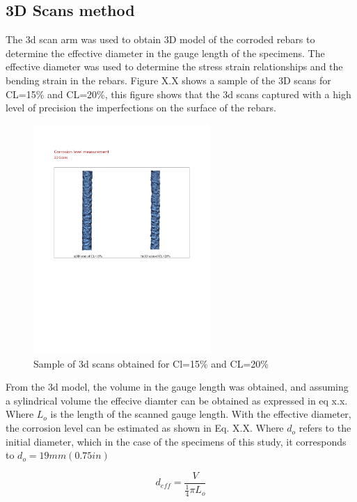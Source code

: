 \subsection{3D Scans method}

The 3d scan arm was used to obtain 3D model of the corroded rebars to determine the effective diameter in the gauge length of the specimens. The effective diameter was used to determine the stress strain relationships and the bending strain in the rebars. Figure X.X shows a sample of the 3D scans for CL=15\% and CL=20\%, this figure shows that the 3d scans captured with a high level of precision the imperfections on the surface of the rebars. 

\begin{figure}[htbp]
	\centering
	\includegraphics[width=0.6\textwidth]{VAC Thesis 2.0/Chapter-4/figs/3dScans_sample.pdf}
	\caption{Sample of 3d scans obtained for Cl=15\% and CL=20\%}
    \label{fig:3D_scans_sample}
\end{figure}

From the 3d model, the volume in the gauge length was obtained, and assuming a sylindrical volume the effecive diamter can be obtained as expressed in eq x.x. Where $L_{o}$ is the length of the scanned gauge length. With the effective diameter, the corrosion level can be estimated as shown in Eq. X.X. Where $d_{o}$ refers to the initial diameter, which in the case of the specimens of this study, it corresponds to $d_{o}=19mm (0.75 in)$

\begin{equation}
    d_{eff}=\frac{V}{\frac{1}{4}\pi L_{o}}
    \label{eq:eff_diameter}
\end{equation}


